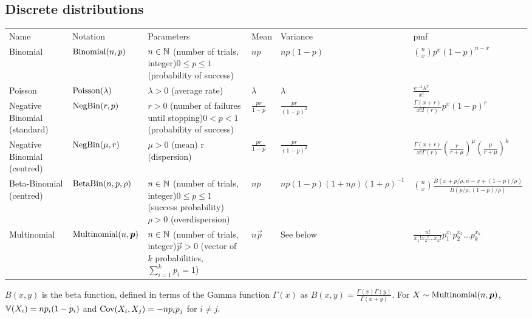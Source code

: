 \documentclass[thesis.tex]{subfiles}
\begin{document}
\begin{landscape}
\section{Discrete distributions}
\begin{tabular}{llp{3.5cm}lll}
Name & Notation & Parameters & Mean & Variance & pmf \\
Binomial & $\operatorname{Binomial}(n, p)$ & $n \in \mathbb{N}$ (number of trials, integer)\newline $0 \leq p \leq 1$ (probability of success) & $np$ & $np(1-p)$ & ${n \choose x}p^x(1-p)^{n-x}$ \\
Poisson & $\operatorname{Poisson}(\lambda)$ & $\lambda > 0$ (average rate) & $\lambda$ & $\lambda$ & $\frac{e^{-\lambda}\lambda^x}{x!}$ \\
Negative Binomial (standard) & $\operatorname{NegBin}(r, p)$ & $r > 0$ (number of failures until stopping)\newline $0 < p < 1$ (probability of success) & $\frac{pr}{1-p}$ & $\frac{pr}{(1-p)^2}$ & $\frac{\Gamma(x+r)}{x! \Gamma(r)} p^x (1-p)^r$ \\
Negative Binomial (centred) & $\operatorname{NegBin}(\mu, r)$ & $\mu > 0$ (mean) \newline r (dispersion) & $\frac{pr}{1-p}$ & $\frac{pr}{(1-p)^2}$ & $\frac{\Gamma(x+r)}{x! \Gamma(r)} \left( \frac{r}{r+\mu} \right)^\mu \left( \frac{\mu}{r+\mu} \right)^k$ \\
Beta-Binomial (centred) & $\operatorname{BetaBin}(n, p, \rho)$ & $n \in \mathbb{N}$ (number of trials, integer)\newline $0 \leq p \leq 1$ (success probability)\newline $\rho > 0$ (overdispersion) & $np$ & $np(1-p)(1+n\rho)(1+\rho)^{-1}$ & ${n \choose x} \frac{B(x+p/\rho, n-x+(1-p)/\rho)}{B(p/\rho, (1-p)/\rho)}$ \\
Multinomial & $\operatorname{Multinomial}(n, \bm{p})$ & $n \in \mathbb{N}$ (number of trials, integer)\newline $\vec{p} > 0$ (vector of $k$ probabilities, $\sum_{i=1}^k p_i = 1$) & $n \vec{p}$ & See below & $\frac{n!}{x_1!x_2!\ldots x_k!}p_1^{x_1}p_2^{x_2}\ldots p_k^{x_k}$ \\
\end{tabular}
$B(x,y)$ is the beta function, defined in terms of the Gamma function $\Gamma(x)$ as $B(x,y) = \frac{\Gamma(x)\Gamma(y)}{\Gamma(x+y)}$.
For $X \sim \operatorname{Multinomial}(n, \bm{p})$, $\operatorname{\mathbb{V}}(X_i) = np_i(1-p_i)$ and $\operatorname{Cov}(X_i, X_j) = -np_ip_j$ for $i \neq j$.
\end{landscape}
\end{document}
